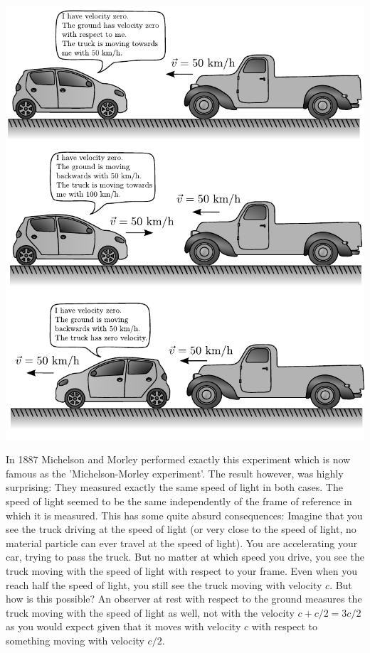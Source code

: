 {\begin{multicols}{2}
\begin{Figure}%
\centering
\includegraphics[width=\textwidth]{fig_7-2.pdf}
\end{Figure}

In 1887 Michelson and Morley performed exactly this experiment which is now famous as the 'Michelson-Morley experiment'. The result however, was highly surprising: They measured exactly the same speed of light in both cases. The speed of light seemed to be the same independently of the frame of reference in which it is measured. This has some quite absurd consequences: Imagine that you see the truck driving at the speed of light (or very close to the speed of light, no material particle can ever travel at the speed of light). You are accelerating your car, trying to pass the truck. But no matter at which speed you drive, you see the truck moving with the speed of light with respect to your frame. Even when you reach half the speed of light, you still see the truck moving with velocity $c$. But how is this possible? An observer at rest with respect to the ground measures the truck moving with the speed of light as well, not with the velocity $c+c/2=3c/2$ as you would expect given that it moves with velocity $c$ with respect to something moving with velocity $c/2$.


\end{multicols}}
